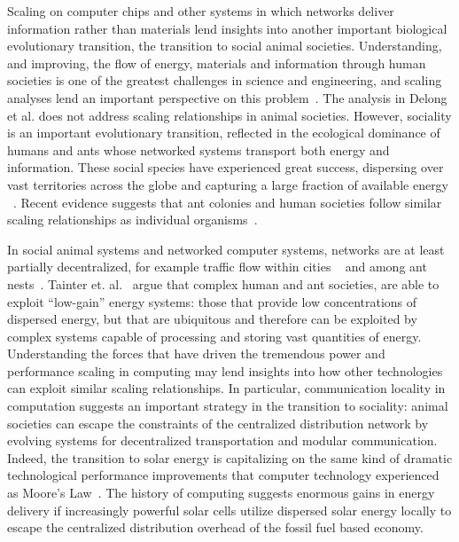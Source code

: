 \documentclass[12pt]{article}
\begin{document}
Scaling on computer chips and other systems in which networks deliver
information rather than materials lend insights into another important
biological evolutionary transition, the transition to social animal societies. Understanding, and improving, the flow of energy, materials and information through human societies is one of the greatest challenges in science and engineering, and scaling analyses lend an important perspective on this problem~\cite{moses2012beyond}.
The analysis in Delong et al. does not address scaling relationships in animal societies.
However, sociality is an important evolutionary transition, reflected in the
ecological dominance of humans and ants whose networked
systems transport both energy and information. These social species have experienced great success, dispersing over vast territories across the globe and capturing a large
fraction of available energy ~\cite{haberl2007quantifying, holldobler1990ants}. Recent evidence suggests that ant colonies and human societies follow similar scaling relationships as individual organisms~\cite{moses2003allometry, bettencourt2007growth, burnside2012human, hou2010energetic, waters2010allometric}. 

In social animal systems and networked computer systems, networks
are at least partially decentralized, for example traffic flow within cities ~\cite{samaniego2008cities} and among ant nests~\cite{flanagan2013fast}. Tainter et. al.~\cite{tainter2003resource} argue that complex human and ant societies, are able to exploit ``low-gain'' energy systems: those that provide low concentrations of dispersed energy, but that are ubiquitous and therefore can be exploited by complex systems capable of processing and storing vast quantities of energy. Understanding the forces that have driven the tremendous power and performance scaling in computing may lend insights into how other technologies can exploit similar scaling relationships. In particular, communication locality in computation suggests an important strategy in the transition to sociality: animal societies can escape the constraints of the centralized distribution network
by evolving systems for decentralized transportation and modular communication. Indeed, the transition to solar energy is capitalizing on the same kind of dramatic technological performance improvements that computer technology experienced as Moore's Law~\cite{farmer2015predictable}.  The history of computing suggests enormous gains in energy delivery if increasingly powerful solar cells utilize dispersed solar energy locally to escape the centralized distribution overhead of the fossil fuel based economy.
 
\end{document}

